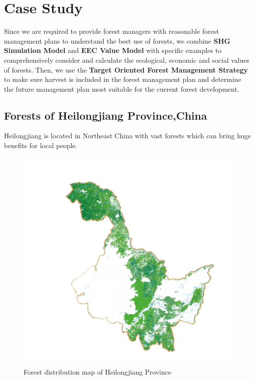 \section{Case Study}

Since we are required to provide forest managers with reasonable forest management plans to understand the best use of forests, we combine \textbf{SHG Simulation Model} and\textbf{ EEC Value Model }with specific examples to comprehensively consider and calculate the ecological, economic and social values of forests. Then, we use the \textbf{Target Oriented Forest Management Strategy} to make sure harvest is included in the forest management plan and determine the future management plan most suitable for the current forest development.

\subsection{Forests of Heilongjiang Province,China}

Heilongjiang is located in Northeast China with vast forests which can bring huge benefits for local people. 

\begin{figure}[H]
\centering
\includegraphics[scale = 0.08]{mcmthesis-demo/figures/heilongjiang.png}
\caption{Forest distribution map of Heilongjiang Province} 
\end{figure}


